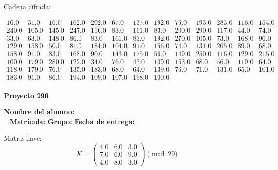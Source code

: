 \documentclass[12pt]{article}
\begin{document}
Cadena cifrada:
\begin{center}
$\begin{array}{lllllllllllll}
16.0 & 31.0 & 16.0 & 162.0 & 202.0 & 67.0 & 137.0 & 192.0 & 75.0 & 193.0 & 283.0 & 116.0 & 154.0\\
240.0 & 105.0 & 145.0 & 247.0 & 116.0 & 83.0 & 161.0 & 83.0 & 200.0 & 290.0 & 117.0 & 44.0 & 74.0\\
33.0 & 63.0 & 148.0 & 86.0 & 83.0 & 161.0 & 83.0 & 192.0 & 270.0 & 105.0 & 73.0 & 168.0 & 96.0\\
129.0 & 158.0 & 50.0 & 81.0 & 184.0 & 104.0 & 91.0 & 156.0 & 74.0 & 131.0 & 205.0 & 89.0 & 68.0\\
158.0 & 91.0 & 83.0 & 168.0 & 90.0 & 143.0 & 175.0 & 56.0 & 149.0 & 250.0 & 116.0 & 129.0 & 215.0\\
100.0 & 179.0 & 280.0 & 122.0 & 34.0 & 76.0 & 43.0 & 109.0 & 163.0 & 68.0 & 56.0 & 119.0 & 64.0\\
118.0 & 179.0 & 76.0 & 135.0 & 183.0 & 68.0 & 64.0 & 139.0 & 76.0 & 71.0 & 131.0 & 65.0 & 101.0\\
183.0 & 91.0 & 86.0 & 194.0 & 109.0 & 107.0 & 198.0 & 100.0\\
\end{array}$
\end{center}

\newpage


\textbf{Proyecto 296}

\textbf{Nombre del alumno:} \underline{\hspace{13cm}}\\\
\vspace{1cm}
\textbf{Matrícula:} \underline{\hspace{4cm}} \hspace{1cm}
\textbf{Grupo:} \underline{\hspace{2cm}}
\textbf{Fecha de entrega:} \underline{\hspace{2cm}}

\medskip

Matriz llave:
\[
K = \begin{pmatrix}
4.0 & 6.0 & 3.0\\
7.0 & 6.0 & 9.0\\
4.0 & 8.0 & 3.0
\end{pmatrix} \pmod{29}
\]
\end{document}
